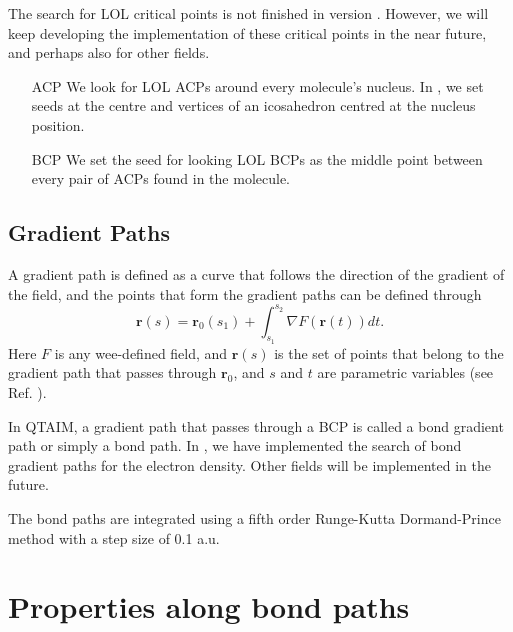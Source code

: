 The search for LOL critical points is not finished in version \dtkversion. However, we will keep developing the implementation of these critical points in the near future, and perhaps also for other fields.

\begin{itemize}
\item[ACP] We look for LOL ACPs around every molecule's nucleus. In \DTK{} \dtkversion,
  we set seeds at the centre and vertices of an icosahedron centred at the nucleus position.
\item[BCP] We set the seed for looking LOL BCPs as the middle point between every pair of ACPs found in the molecule.
\end{itemize}

\subsection{Gradient Paths}

A gradient path is defined as a curve that follows the direction of the gradient of the field, and the points that form the gradient paths can be defined through
%
\begin{equation}
   \boldsymbol{r}(s)=\boldsymbol{r}_0(s_1)+\int_{s_1}^{s_2}\nabla F(\boldsymbol{r}(t))dt.
\end{equation}
%
Here $F$ is any wee-defined field, and $\boldsymbol{r}(s)$ is the set of points that belong to the gradient path that passes through $\boldsymbol{r}_0$, and $s$ and $t$ are parametric variables (see Ref. \cite{bib:bader1990book}).

In QTAIM, a gradient path that passes through a BCP is called a bond gradient path or simply a bond path. In \DTK{} \dtkversion, we have implemented the search of bond gradient paths for the electron density. Other fields will be implemented in the future.

The bond paths are integrated using a fifth order Runge-Kutta Dormand-Prince method with a
step size of 0.1 a.u.


\section{Properties along bond paths}

